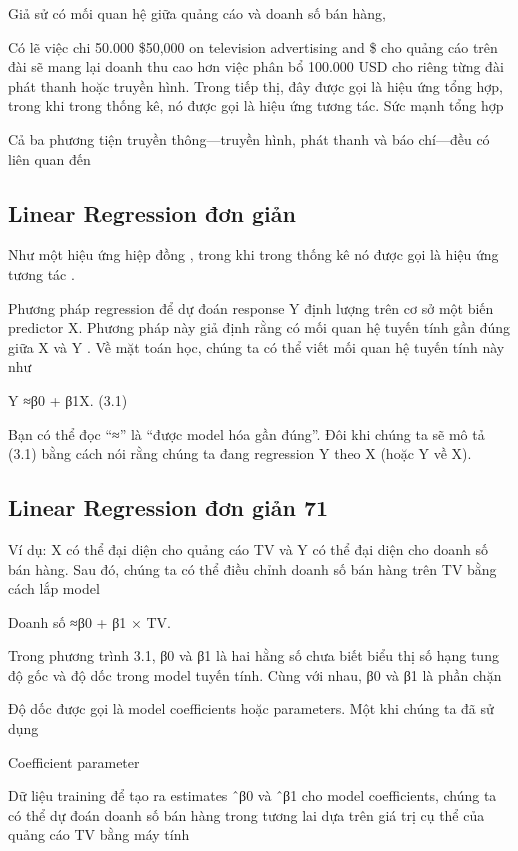 Giả sử có mối quan hệ giữa quảng cáo và doanh số bán hàng,

Có lẽ việc chi 50.000 \$50,000 on television advertising and \$ cho quảng cáo trên đài sẽ mang lại doanh thu cao hơn việc phân bổ 100.000 USD cho riêng từng đài phát thanh hoặc truyền hình. Trong tiếp thị, đây được gọi là hiệu ứng tổng hợp, trong khi trong thống kê, nó được gọi là hiệu ứng tương tác. Sức mạnh tổng hợp

Cả ba phương tiện truyền thông—truyền hình, phát thanh và báo chí—đều có liên quan đến

\subsection{Linear Regression đơn giản}

Như một hiệu ứng hiệp đồng , trong khi trong thống kê nó được gọi là hiệu ứng tương tác .

Phương pháp regression để dự đoán response Y định lượng trên cơ sở một biến predictor X. Phương pháp này giả định rằng có mối quan hệ tuyến tính gần đúng giữa X và Y . Về mặt toán học, chúng ta có thể viết mối quan hệ tuyến tính này như

Y ≈β0 + β1X. (3.1)

Bạn có thể đọc “≈” là “được model hóa gần đúng”. Đôi khi chúng ta sẽ mô tả (3.1) bằng cách nói rằng chúng ta đang regression Y theo X (hoặc Y về X).

\subsection{Linear Regression đơn giản 71}

Ví dụ: X có thể đại diện cho quảng cáo TV và Y có thể đại diện cho doanh số bán hàng. Sau đó, chúng ta có thể điều chỉnh doanh số bán hàng trên TV bằng cách lắp model

Doanh số ≈β0 + β1 × TV.

Trong phương trình 3.1, β0 và β1 là hai hằng số chưa biết biểu thị số hạng tung độ gốc và độ dốc trong model tuyến tính. Cùng với nhau, β0 và β1 là phần chặn

Độ dốc được gọi là model coefficients hoặc parameters. Một khi chúng ta đã sử dụng

Coefficient parameter

Dữ liệu training để tạo ra estimates ˆβ0 và ˆβ1 cho model coefficients, chúng ta có thể dự đoán doanh số bán hàng trong tương lai dựa trên giá trị cụ thể của quảng cáo TV bằng máy tính

